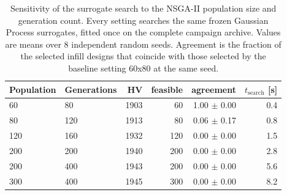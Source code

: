 \begin{table}[htbp]
\centering
\caption{Sensitivity of the surrogate search to the NSGA-II population size and generation count. Every setting searches the same frozen Gaussian Process surrogates, fitted once on the complete campaign archive. Values are means over 8 independent random seeds. Agreement is the fraction of the selected infill designs that coincide with those selected by the baseline setting 60x80 at the same seed.}
\label{tab:nsga_sensitivity}
\begin{tabular}{llrrrr}
\toprule
Population & Generations & HV & feasible & agreement & $t_{\mathrm{search}}$ [s] \\
\midrule
60 & 80 & 1903 & 60 & 1.00 $\pm$ 0.00 & 0.4 \\
80 & 120 & 1913 & 80 & 0.06 $\pm$ 0.17 & 0.8 \\
120 & 160 & 1932 & 120 & 0.00 $\pm$ 0.00 & 1.5 \\
200 & 200 & 1940 & 200 & 0.00 $\pm$ 0.00 & 2.8 \\
200 & 400 & 1943 & 200 & 0.00 $\pm$ 0.00 & 5.6 \\
300 & 400 & 1945 & 300 & 0.00 $\pm$ 0.00 & 8.2 \\
\bottomrule
\end{tabular}
\end{table}
